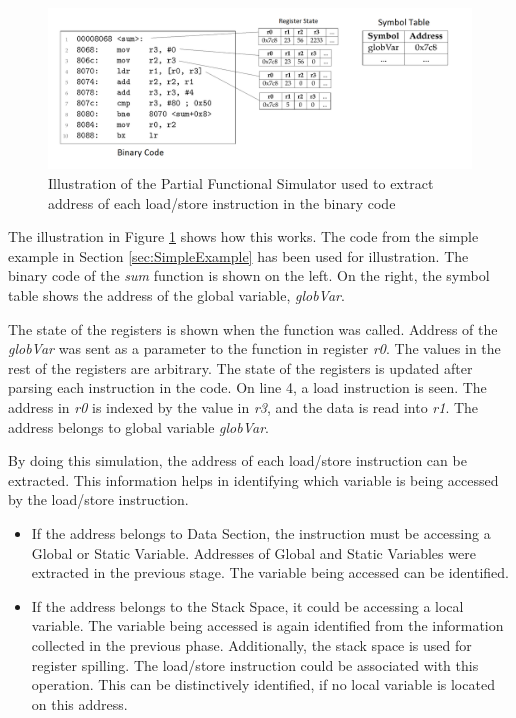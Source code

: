 \begin{figure}[h!]
\centering
\includegraphics[width=\textwidth]{figures/ParitalSimulator.png}
\vspace*{-20pt}
\caption{Illustration of the Partial Functional Simulator used to extract address of each load/store instruction in the binary code}
\label{fig:partialSimulator}
\end{figure}

The illustration in Figure \ref{fig:partialSimulator} shows how this works. The code from the simple example in Section \ref{sec:SimpleExample} has been used for illustration. The binary code of the \emph{sum} function is shown on the left. On the right, the symbol table shows the address of the global variable, \emph{globVar}. 

The state of the registers is shown when the function was called. Address of the \emph{globVar} was sent as a parameter to the function in register \emph{r0}. The values in the rest of the registers are arbitrary. The state of the registers is updated after parsing each instruction in the code. On line 4, a load instruction is seen. The address in \emph{r0} is indexed by the value in \emph{r3}, and the data is read into \emph{r1}. The address belongs to global variable \emph{globVar}. 

By doing this simulation, the address of each load/store instruction can be extracted. This information helps in identifying which variable is being accessed by the load/store instruction. 

\begin{itemize}
\item If the address belongs to Data Section, the instruction must be accessing a Global or Static Variable. Addresses of Global and Static Variables were extracted in the previous stage. The variable being accessed can be identified. 
\item If the address belongs to the Stack Space, it could be accessing a local variable. The variable being accessed is again identified from the information collected in the previous phase. Additionally, the stack space is used for register spilling. The load/store instruction could be associated with this operation. This can be distinctively identified, if no local variable is located on this address.
\end{itemize}

